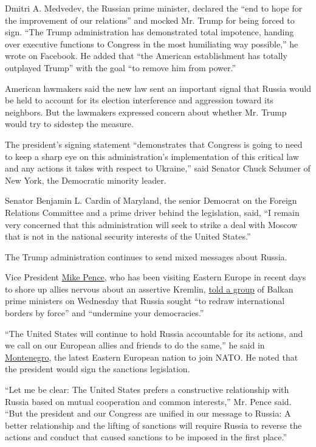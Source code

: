 Dmitri A. Medvedev, the Russian prime minister, declared the ``end to
hope for the improvement of our relations'' and mocked Mr. Trump for
being forced to sign. ``The Trump administration has demonstrated total
impotence, handing over executive functions to Congress in the most
humiliating way possible,'' he wrote on Facebook. He added that ``the
American establishment has totally outplayed Trump'' with the goal ``to
remove him from power.''

American lawmakers said the new law sent an important signal that Russia
would be held to account for its election interference and aggression
toward its neighbors. But the lawmakers expressed concern about whether
Mr. Trump would try to sidestep the measure.

The president's signing statement ``demonstrates that Congress is going
to need to keep a sharp eye on this administration's implementation of
this critical law and any actions it takes with respect to Ukraine,''
said Senator Chuck Schumer of New York, the Democratic minority leader.

Senator Benjamin L. Cardin of Maryland, the senior Democrat on the
Foreign Relations Committee and a prime driver behind the legislation,
said, ``I remain very concerned that this administration will seek to
strike a deal with Moscow that is not in the national security interests
of the United States.''

The Trump administration continues to send mixed messages about Russia.

Vice President
\href{http://topics.nytimes.com/top/reference/timestopics/people/p/mike_pence/index.html}{Mike
Pence}, who has been visiting Eastern Europe in recent days to shore up
allies nervous about an assertive Kremlin,
\href{https://www.nytimes.com/2017/08/02/world/europe/pence-montenegro-markovic-nato.html?ref=topics}{told
a group} of Balkan prime ministers on Wednesday that Russia sought ``to
redraw international borders by force'' and ``undermine your
democracies.''

``The United States will continue to hold Russia accountable for its
actions, and we call on our European allies and friends to do the
same,'' he said in
\href{https://www.nytimes.com/topic/destination/montenegro?inline=nyt-geo}{Montenegro},
the latest Eastern European nation to join NATO. He noted that the
president would sign the sanctions legislation.

``Let me be clear: The United States prefers a constructive relationship
with Russia based on mutual cooperation and common interests,'' Mr.
Pence said. ``But the president and our Congress are unified in our
message to Russia: A better relationship and the lifting of sanctions
will require Russia to reverse the actions and conduct that caused
sanctions to be imposed in the first place.''

